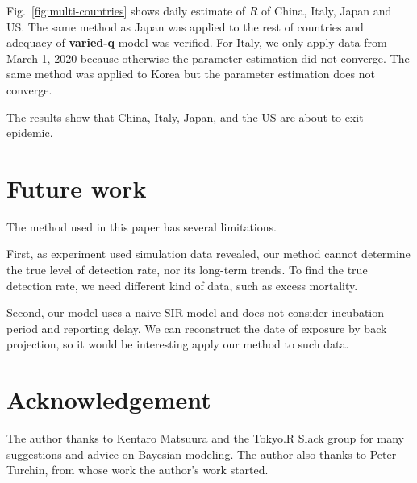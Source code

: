 \documentclass{amsart}
\begin{document}
Fig.~\ref{fig:multi-countries} shows daily estimate of $R$ of China, Italy, Japan and US.
The same method as Japan was applied to the rest of countries and adequacy of \textbf{varied-q} model was verified.
For Italy, we only apply data from March 1, 2020 because otherwise the parameter estimation did not converge.
The same method was applied to Korea but the parameter estimation does not converge.

The results show that China, Italy, Japan, and the US are about to exit epidemic.

\section{Future work}

The method used in this paper has several limitations.

First, as experiment used simulation data revealed, our method cannot determine the true level of detection rate, nor its long-term trends.
To find the true detection rate, we need different kind of data, such as excess mortality.

Second, our model uses a naive SIR model and does not consider incubation period and reporting delay.
We can reconstruct the date of exposure by back projection, so it would be interesting apply our method to such data.

\section*{Acknowledgement}

The author thanks to Kentaro Matsuura and the Tokyo.R Slack group for many suggestions and advice on Bayesian modeling.
The author also thanks to Peter Turchin, from whose work the author's work started.



\end{document}
